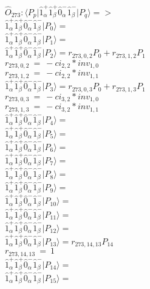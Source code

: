 \documentclass[14pt]{article}
\begin{document}
    $\hat{O}_{273}:  \langle{P_p}\vert \hat{1}_{\alpha}^{+}\hat{1}_{\beta}^{+}\hat{0}_{\alpha}^{-}\hat{1}_{\beta}^{-} \vert{P_q}\rangle => $ \\ 
    $ \hat{1}_{\alpha}^{+}\hat{1}_{\beta}^{+}\hat{0}_{\alpha}^{-}\hat{1}_{\beta}^{-} \vert{P_{0}}\rangle =  $ \\ 
    $ \hat{1}_{\alpha}^{+}\hat{1}_{\beta}^{+}\hat{0}_{\alpha}^{-}\hat{1}_{\beta}^{-} \vert{P_{1}}\rangle =  $ \\ 
    $ \hat{1}_{\alpha}^{+}\hat{1}_{\beta}^{+}\hat{0}_{\alpha}^{-}\hat{1}_{\beta}^{-} \vert{P_{2}}\rangle = {r}_{273,0,2}P_{0}+{r}_{273,1,2}P_{1} $ \\ 
    ${r}_{273,0,2}\ =\ -{ci}_{2,2}*{inv}_{1,0} $ \\ 
    ${r}_{273,1,2}\ =\ -{ci}_{2,2}*{inv}_{1,1} $ \\ 
    $ \hat{1}_{\alpha}^{+}\hat{1}_{\beta}^{+}\hat{0}_{\alpha}^{-}\hat{1}_{\beta}^{-} \vert{P_{3}}\rangle = {r}_{273,0,3}P_{0}+{r}_{273,1,3}P_{1} $ \\ 
    ${r}_{273,0,3}\ =\ -{ci}_{3,2}*{inv}_{1,0} $ \\ 
    ${r}_{273,1,3}\ =\ -{ci}_{3,2}*{inv}_{1,1} $ \\ 
    $ \hat{1}_{\alpha}^{+}\hat{1}_{\beta}^{+}\hat{0}_{\alpha}^{-}\hat{1}_{\beta}^{-} \vert{P_{4}}\rangle =  $ \\ 
    $ \hat{1}_{\alpha}^{+}\hat{1}_{\beta}^{+}\hat{0}_{\alpha}^{-}\hat{1}_{\beta}^{-} \vert{P_{5}}\rangle =  $ \\ 
    $ \hat{1}_{\alpha}^{+}\hat{1}_{\beta}^{+}\hat{0}_{\alpha}^{-}\hat{1}_{\beta}^{-} \vert{P_{6}}\rangle =  $ \\ 
    $ \hat{1}_{\alpha}^{+}\hat{1}_{\beta}^{+}\hat{0}_{\alpha}^{-}\hat{1}_{\beta}^{-} \vert{P_{7}}\rangle =  $ \\ 
    $ \hat{1}_{\alpha}^{+}\hat{1}_{\beta}^{+}\hat{0}_{\alpha}^{-}\hat{1}_{\beta}^{-} \vert{P_{8}}\rangle =  $ \\ 
    $ \hat{1}_{\alpha}^{+}\hat{1}_{\beta}^{+}\hat{0}_{\alpha}^{-}\hat{1}_{\beta}^{-} \vert{P_{9}}\rangle =  $ \\ 
    $ \hat{1}_{\alpha}^{+}\hat{1}_{\beta}^{+}\hat{0}_{\alpha}^{-}\hat{1}_{\beta}^{-} \vert{P_{10}}\rangle =  $ \\ 
    $ \hat{1}_{\alpha}^{+}\hat{1}_{\beta}^{+}\hat{0}_{\alpha}^{-}\hat{1}_{\beta}^{-} \vert{P_{11}}\rangle =  $ \\ 
    $ \hat{1}_{\alpha}^{+}\hat{1}_{\beta}^{+}\hat{0}_{\alpha}^{-}\hat{1}_{\beta}^{-} \vert{P_{12}}\rangle =  $ \\ 
    $ \hat{1}_{\alpha}^{+}\hat{1}_{\beta}^{+}\hat{0}_{\alpha}^{-}\hat{1}_{\beta}^{-} \vert{P_{13}}\rangle = {r}_{273,14,13}P_{14} $ \\ 
    ${r}_{273,14,13}\ =\ 1 $ \\ 
    $ \hat{1}_{\alpha}^{+}\hat{1}_{\beta}^{+}\hat{0}_{\alpha}^{-}\hat{1}_{\beta}^{-} \vert{P_{14}}\rangle =  $ \\ 
    $ \hat{1}_{\alpha}^{+}\hat{1}_{\beta}^{+}\hat{0}_{\alpha}^{-}\hat{1}_{\beta}^{-} \vert{P_{15}}\rangle =  $ \\ 
    
\end{document}
